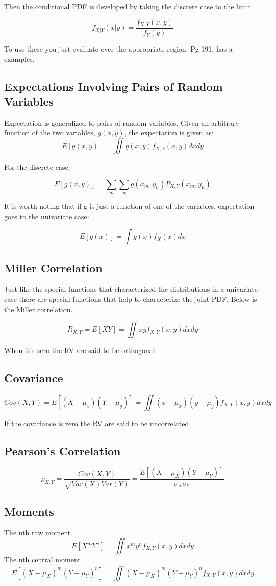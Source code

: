\documentclass[12pt]{article}
\begin{document}
Then the conditional PDF is developed by taking the discrete case 
to the limit.

\[f_{X|Y}(x|y) = \frac{f_{X,Y}(x,y)}{f_Y(y)}\]

To use these you just evaluate over the appropriate region. Pg 191,
has a examples.

\subsection{Expectations Involving Pairs of Random Variables}
Expectation is generalized to pairs of random variables. Given
an arbitrary function of the two variables, $g(x,y)$, the 
expectation is given as:
\[E[g(x,y)]=\iint g(x,y)f_{X,Y}(x,y)dxdy\]

For the discrete case:

\[E[g(x,y)]=\sum_m \sum_n g(x_m,y_n)P_{X,Y}(x_m,y_n)\]

It is worth noting that if g is just a function of one of the
variables, expectation goes to the univariate case:

\[E[g(x)] = \int g(x)f_X(x)dx\]

\subsection{Miller Correlation}
Just like the special functions that characterized the 
distributions in a univariate case there are special functions
that help to characterize the joint PDF. Below is the Miller 
correlation. 

\[R_{X,Y} = E[XY] = \iint xyf_{X,Y}(x,y)dxdy\]

When it's zero the RV are said to be orthogonal.

\subsection{Covariance}
\[Cov(X,Y) = E[(X-\mu_x)(Y-\mu_y)] = \iint(x-\mu_x)(y-\mu_y)f_{X,Y}(x,y)dxdy\]

If the covariance is zero the RV are said to be uncorrelated.

\subsection{Pearson's Correlation}
\[\rho_{X,Y} = \frac{Cov(X,Y)}{\sqrt{Var(X)Var(Y)}} = \frac{E[(X-\mu_X)(Y-\mu_Y)]}{\sigma_X\sigma_Y}\]

\subsection{Moments}
The nth raw moment
\[E[X^mY^n] = \iint x^m y^n f_{X,Y}(x,y)dxdy\]
The nth central moment
\[E[(X-\mu_X)^m(Y-\mu_Y)^n] = \iint (X-\mu_X)^m(Y-\mu_Y)^nf_{X,Y}(x,y)dxdy\]
\end{document}
